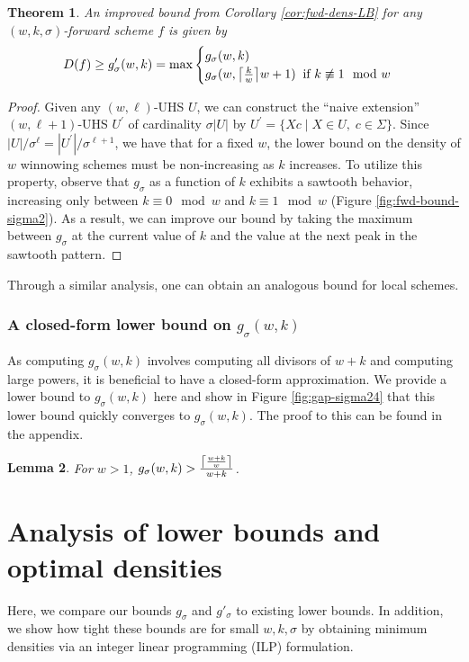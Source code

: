 \documentclass{article}
\newtheorem{theorem}{Theorem}[section]
\newtheorem{lemma}[theorem]{Lemma}
\DeclarePairedDelimiter\ceil{\lceil}{\rceil}
\begin{document}
\begin{theorem} An improved bound from Corollary \ref{cor:fwd-dens-LB} for any $(w, k, \sigma)$-forward scheme $f$ is given by
\begin{equation*}
D(f) \geq g'_\sigma(w,k)=\max
\begin{cases} 
g_{\sigma}(w, k) \\
g_{\sigma}(w, \ceil*{\frac{k}{w}}w + 1) \;\; \text{if } k\not\equiv 1 \mod w
\end{cases}
\end{equation*}
\end{theorem}
\begin{proof}
Given any $(w,\ell)$-UHS $U$, we can construct the ``naive extension''~\citep{marccais2018asymptotically} $(w,\ell+1)$-UHS $U^\prime$ of cardinality $\sigma |U|$ by $U^\prime=\{Xc \;|\; X \in U, \; c\in\Sigma\}
$. Since ${|U|}/{\sigma^{\ell}}={|U^\prime|}/{\sigma^{\ell+1}}$, we have that for a fixed $w$, the lower bound on the density of $w$ winnowing schemes must be non-increasing as $k$ increases. To utilize this property, observe that $g_\sigma$ as a function of $k$ exhibits a sawtooth behavior, increasing only between $k\equiv 0\mod w$ and $k \equiv 1 \mod w$ (Figure \ref{fig:fwd-bound-sigma2}). As a result, we can improve our bound by taking the maximum between $g_\sigma$ at the current value of $k$ and the value at the next peak in the sawtooth pattern.
\end{proof}

Through a similar analysis, one can obtain an analogous bound for local schemes.

\subsubsection{A closed-form lower bound on $g_\sigma(w, k)$}
As computing $g_\sigma(w, k)$ involves computing all divisors of $w+k$ and computing large powers, it is beneficial to have a closed-form approximation. We provide a lower bound to $g_\sigma(w,k)$ here and show in Figure \ref{fig:gap-sigma24} that this lower bound quickly converges to $g_\sigma(w, k)$. The proof to this can be found in the appendix. 

\begin{lemma}
\label{lem:simple-vs-complex}
For $w>1$, $g_\sigma(w, k) > \frac{\ceil*{\frac{w+k}{w}}}{w+k}$.
\end{lemma}

\section{Analysis of lower bounds and optimal densities}
Here, we compare our bounds $g_\sigma$ and $g'_\sigma$ to existing lower bounds. In addition, we show how tight these bounds are for small $w,k,\sigma$ by obtaining minimum densities via an integer linear programming (ILP) formulation.
\end{document}
